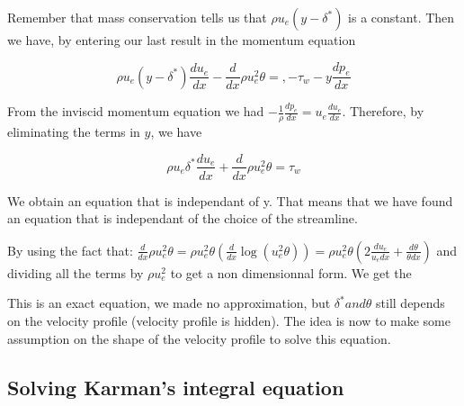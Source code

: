 Remember that mass conservation tells us that $\rho u_e(y-\delta^*)$ is a constant. Then we have, by entering our last result in the momentum equation

\begin{equation}
\rho u_e(y-\delta^*)\frac{d u_e}{d x}- \frac{d}{d x} \rho u_e^2\theta =,-\tau_w-y \frac{d p_e}{d x} 
\end{equation}

From the inviscid momentum equation we had $
- \frac{1}{\rho}\frac{d p_e}{d x} = u_e \frac{d u_e}{d x}$. Therefore, by eliminating the terms in $y$, we have

\begin{equation}
 \rho u_e\delta^* \frac{d u_e}{d x}+ \frac{d}{d x} \rho u_e^2 \theta=\tau_w
\end{equation}

We obtain an equation that is independant of y. That means that we have found an equation that is independant of the choice of the streamline.

By using the fact that: $ \frac{d}{d x} \rho u_e^2 \theta = \rho u_e^2 \theta (\frac{d}{d x} \log(u_e^2 \theta))=\rho u_e^2 \theta(2\frac{d u_e}{u_e d x}+\frac{d \theta}{\theta d x})$ and dividing all the terms by $\rho u_e^2 $ to get a non dimensionnal form. We get the

\begin{center}
\end{center}

This is an exact equation, we made no approximation, but $\delta ^* and \theta$ still depends on the velocity profile (velocity profile is hidden). The idea is now to make some assumption on the shape of the velocity profile to solve this equation.

\subsection{Solving Karman's integral equation}

